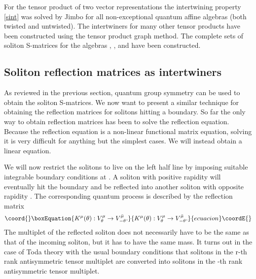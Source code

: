 \documentclass[a4paper,12pt]{article}
\providecommand{\mub}{\bar{\mu}}
\numberwithin{equation}{section}
\begin{document}
For the tensor product of two vector representations the
intertwining property \eqref{sint} was solved by Jimbo
\cite{Jim86} for all non-exceptional quantum affine algebras (both
twisted and untwisted). The intertwiners for many other tensor
products have been constructed \cite{Del94} using the tensor
product graph method. The complete sets of soliton S-matrices for
the algebras \coordHE{} \cite{Hol92}, \coordHE{}
\cite{Gan95}, and \coordHE{} \cite{Gan96} have been
constructed.





\subsection{Soliton reflection matrices as intertwiners\label{sectsrmi}}

As reviewed in the previous section, quantum group symmetry can be
used to obtain the soliton S-matrices. We now want to present a
similar technique for obtaining the reflection matrices for
solitons hitting a boundary. So far the only way to obtain
reflection matrices has been to solve the reflection equation.
Because the reflection equation is a non-linear functional matrix
equation, solving it is very difficult for anything but the
simplest cases. We will instead obtain a linear equation.

We will now restrict the solitons to live on the left half line
\coordHE{} by imposing suitable integrable boundary conditions at
\coordHE{}. A soliton with positive rapidity \myHighlight{$\theta$}\coordHE{} will eventually
hit the boundary and be reflected into another soliton with
opposite rapidity \myHighlight{$-\theta$}\coordHE{}. The corresponding quantum process is
described by the reflection matrix
\begin{equation}\coord{}\boxEquation{
  K^\mu(\theta): V^\mu_\theta\rightarrow V^{\mub}_{-\theta}.
}{
  K^\mu(\theta): V^\mu_\theta\rightarrow V^{\mub}_{-\theta}.
}{ecuacion}\coordE{}\end{equation}
The multiplet \myHighlight{$\mub$}\coordHE{} of the reflected soliton does not necessarily
have to be the same as that of the incoming soliton, but it has to
have the same mass. It turns out \cite{Del98a} in the case of
\coordHE{} Toda theory with the usual boundary conditions that
solitons in the r-th rank antisymmetric tensor multiplet are
converted into solitons in the \coordHE{}-th rank antisymmetric
tensor multiplet.
\end{document}
